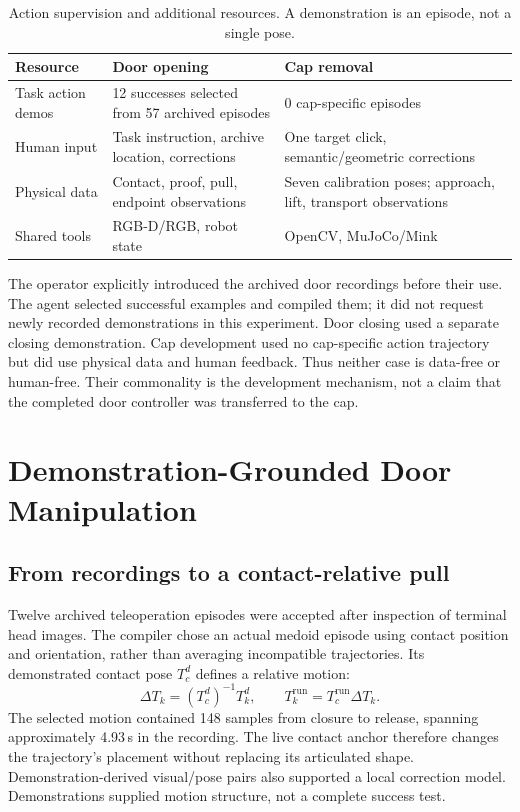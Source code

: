 \begin{table}[t]
\caption{Action supervision and additional resources. A demonstration is an
episode, not a single pose.}
\label{tab:resources}\centering\small
\begin{tabularx}{\columnwidth}{lYY}\toprule
Resource & Door opening & Cap removal\\\midrule
Task action demos & 12 successes selected from 57 archived episodes & 0 cap-specific episodes\\
Human input & Task instruction, archive location, corrections & One target click, semantic/geometric corrections\\
Physical data & Contact, proof, pull, endpoint observations & Seven calibration poses; approach, lift, transport observations\\
Shared tools & RGB-D/RGB, robot state & OpenCV, MuJoCo/Mink\\
\bottomrule\end{tabularx}
\end{table}

The operator explicitly introduced the archived door recordings before their
use. The agent selected successful examples and compiled them; it did not
request newly recorded demonstrations in this experiment. Door closing used a
separate closing demonstration. Cap development used no cap-specific action
trajectory but did use physical data and human feedback. Thus neither case is
data-free or human-free. Their commonality is the development mechanism, not a
claim that the completed door controller was transferred to the cap.

\section{Demonstration-Grounded Door Manipulation}
\subsection{From recordings to a contact-relative pull}
Twelve archived teleoperation episodes were accepted after inspection of
terminal head images. The compiler chose an actual medoid episode using contact
position and orientation, rather than averaging incompatible trajectories.
Its demonstrated contact pose $T_c^d$ defines a relative motion:
\begin{equation}
 \Delta T_k=(T_c^d)^{-1}T_k^d,\qquad
 T_k^{\mathrm{run}}=T_c^{\mathrm{run}}\Delta T_k.
\label{eq:relative}
\end{equation}
The selected motion contained 148 samples from closure to release, spanning
approximately 4.93\,s in the recording. The live contact anchor therefore
changes the trajectory's placement without replacing its articulated shape.
Demonstration-derived visual/pose pairs also supported a local correction
model. Demonstrations supplied motion structure, not a complete success test.

